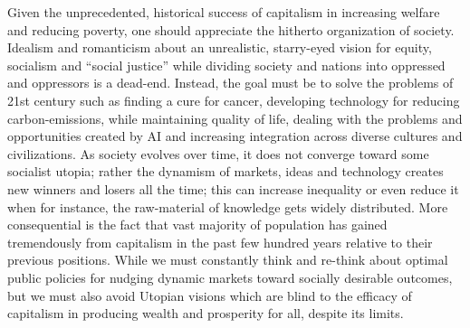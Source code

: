 \documentclass[12pt]{article}
\newcommand{\1}{\mathbbm 1}
\begin{document}
		Given the unprecedented, historical success of capitalism in increasing welfare and reducing poverty, one should appreciate the hitherto organization of society. Idealism and romanticism about an unrealistic, starry-eyed vision for equity, socialism and ``social justice'' while dividing society and nations into oppressed and oppressors is a dead-end. Instead, the goal must be to solve the problems of 21st century such as finding a cure for cancer, developing technology for reducing carbon-emissions, while maintaining quality of life, dealing with the problems and opportunities created by AI and increasing integration across diverse cultures and civilizations. As society evolves over time, it does not converge toward some socialist utopia; rather the dynamism of markets, ideas and technology creates new winners and losers all the time; this can increase inequality or even reduce it when for instance, the raw-material of knowledge gets widely distributed. More consequential is the fact that vast majority of population has gained tremendously from capitalism in the past few hundred years relative to their previous positions. While we must constantly think and re-think about optimal public policies for nudging dynamic markets toward socially desirable outcomes, but we must also avoid Utopian visions which are blind to the efficacy of capitalism in producing wealth and prosperity for all, despite its limits.
	
		\newpage
		
		

		\singlespacing
		
		
		\clearpage
		
		
		
		
		
		
		\newpage
		
		
		
		
		
		
		
		
		
		
		
		
		
		
		
	
\end{document}
